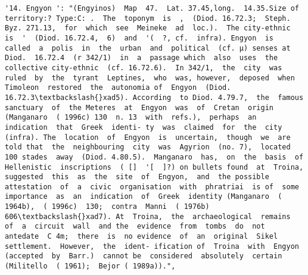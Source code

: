 \documentclass[11pt]{article}
\begin{document}
\begin{Verbatim}[commandchars=\\\{\}]
         '14. Engyon ': "(Engyinos)  Map  47.  Lat. 37.45,long.  14.35.Size of  territory:? Type:C: .  The  toponym  is  ,  (Diod. 16.72.3;  Steph.  Byz. 271.13,  for  which  see  Meineke  ad  loc.).  The city-ethnic  is  '  (Diod. 16.72.4,  6)  and  '(  ?, cf.  infra). Engyon  is  called  a  polis  in  the  urban  and  political  (cf. µ) senses at Diod.  16.72.4  (r 342/1)  in  a  passage which  also  uses  the  collective city-ethnic  (cf. 16.72.6).  In 342/1,  the  city  was  ruled  by  the  tyrant  Leptines,  who  was, however,  deposed  when  Timoleon  restored  the  autonomia of  Engyon  (Diod. 16.72.3\textbackslash{}xad5). According  to Diod. 4.79.7,  the  famous  sanctuary  of  the Meteres  at  Engyon  was  of  Cretan  origin  (Manganaro  ( 1996c) 130  n. 13  with  refs.),  perhaps  an  indication  that  Greek  identi- ty  was  claimed  for  the  city  (infra). The  location  of  Engyon  is  uncertain,  though  we  are  told that  the  neighbouring  city  was  Agyrion  (no. 7),  located  100 stades  away  (Diod. 4.80.5).  Manganaro  has,  on  the  basis  of Hellenistic  inscriptions  ( []  '[  ]?) on bullets found  at  Troina,  suggested  this  as  the  site  of  Engyon,  and  the possible  attestation  of  a  civic  organisation  with  phratriai  is of  some  importance  as  an  indication  of  Greek  identity (Manganaro  ( 1964b),  ( 1996c)  130;  contra  Manni  ( 1976b) 606\textbackslash{}xad7). At  Troina,  the  archaeological  remains  of  a  circuit  wall  and the  evidence  from  tombs  do  not  antedate  C 4m;  there  is  no evidence  of  an  original  Sikel  settlement.  However,  the  ident- ification of  Troina  with  Engyon  (accepted  by  Barr.)  cannot be  considered  absolutely  certain  (Militello  ( 1961);  Bejor ( 1989a)).",

\end{Verbatim}
\end{document}
